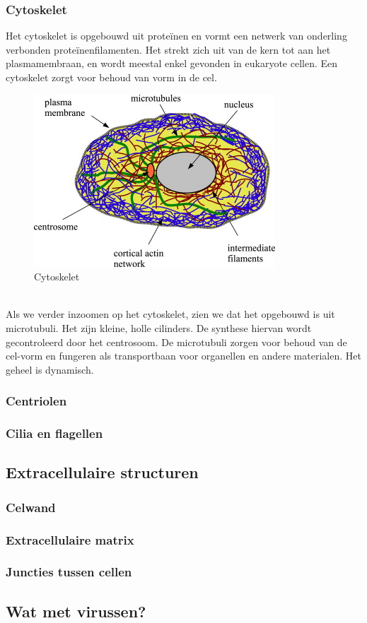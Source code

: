 \documentclass[a4paper,kul]{kulakarticle} %
\begin{document}
\subsubsection{Cytoskelet}
Het cytoskelet is opgebouwd uit proteïnen en vormt een netwerk van onderling verbonden proteïnenfilamenten. Het strekt zich uit van de kern tot aan het plasmamembraan, en wordt meestal enkel gevonden in eukaryote cellen. Een cytoskelet zorgt voor behoud van vorm in de cel.
\begin{figure}[h]
	\centering
	\includegraphics[width=0.5\linewidth]{Cytoskelet}
	\caption[Cytoskelet]{Cytoskelet}
	\label{fig:cytoskelet}
\end{figure}\\
Als we verder inzoomen op het cytoskelet, zien we dat het opgebouwd is uit microtubuli. Het zijn kleine, holle cilinders. De synthese hiervan wordt gecontroleerd door het centrosoom. De microtubuli zorgen voor behoud van de cel-vorm en fungeren als transportbaan voor organellen en andere materialen. Het geheel is dynamisch.

\subsubsection{Centriolen}

\subsubsection{Cilia en flagellen}
\subsection{Extracellulaire structuren}
\subsubsection{Celwand}
\subsubsection{Extracellulaire matrix}
\subsubsection{Juncties tussen cellen}
\subsection{Wat met virussen?}
\end{document}

